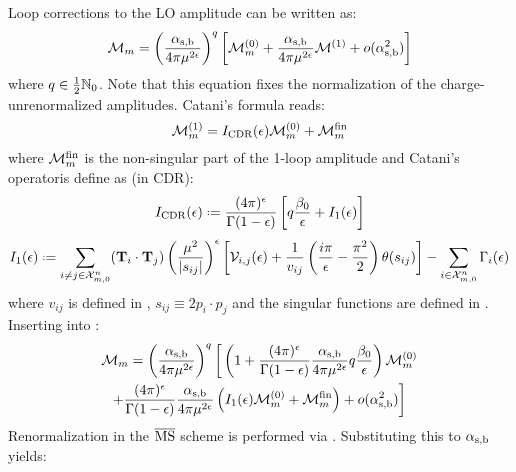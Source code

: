 Loop corrections to the LO amplitude can be written as:
\begin{equation}
  \mathcal{M}_m = \left( \frac{\alpha_\text{s,b}}{4\pi \mu^{2\epsilon}} \right)^q \left[ \mathcal{M}_m^{(0)} + \frac{\alpha_\text{s,b}}{4\pi \mu^{2\epsilon}} \mathcal{M}^{(1)} + o(\alpha_\text{s,b}^2) \right]
  \label{eq:ampl-non-ren}
\end{equation}
where $ q \in \frac{1}{2} \mathbb{N}_0 $. Note that this equation fixes the normalization of the charge-unrenormalized amplitudes. Catani's formula reads:
\begin{equation}
  \mathcal{M}_m^{(1)} = I_\text{CDR}(\epsilon) \mathcal{M}_m^{(0)} + \mathcal{M}_m^\text{fin}
  \label{eq:gen-cat-form}
\end{equation}
where $ \mathcal{M}_m^\text{fin} $ is the non-singular part of the 1-loop amplitude and Catani's operator\footnotemark is define as (in CDR):
\begin{equation}
  \irs(\de) \defeq \frac{(4\pi)^\de}{\Gamma(1-\de)} \left[ q \frac{\beta_0}{\de} + \ioo(\de) \right]
\end{equation}
\begin{equation}
  \ioo(\de) \defeq \sum_{i \neq j \in \fsp{n}{m}} (\cc) \left( \frac{\mu^2}{\abs{s_{ij}}} \right)^\de \left[ \ns_{i,j}(\de) + \frac{1}{v_{ij}} \left( \frac{i\pi}{\de} - \frac{\pi^2}{2} \right) \theta(s_{ij}) \right] - \sum_{i \in \fsp{n}{m}} \Gamma_i(\de)
  \label{eq:gen-cat}
\end{equation}
where $ v_{ij} $ is defined in , $ s_{ij} \equiv 2 p_i \cdot p_j $ and the singular functions are defined in . Inserting  into :
\begin{multline*}
  \mathcal{M}_m = \left( \frac{\alpha_\text{s,b}}{4\pi \mu^{2\epsilon}} \right)^q \bigg[ \left( 1 + \frac{(4\pi)^\epsilon}{\Gamma(1-\epsilon)} \frac{\alpha_\text{s,b}}{4\pi \mu^{2\epsilon}} q \frac{\beta_0}{\epsilon} \right) \mathcal{M}_m^{(0)} \\
  + \frac{(4\pi)^\epsilon}{\Gamma(1-\epsilon)} \frac{\alpha_\text{s,b}}{4\pi \mu^{2\epsilon}} \left( I_1(\epsilon) \mathcal{M}_m^{(0)} + \mathcal{M}_m^\text{fin} \right) + o(\alpha_\text{s,b}^2) \bigg]
\end{multline*}
Renormalization in the $ \overline{\text{MS}} $ scheme is performed via . Substituting this to $ \alpha_\text{s,b} $ yields:
